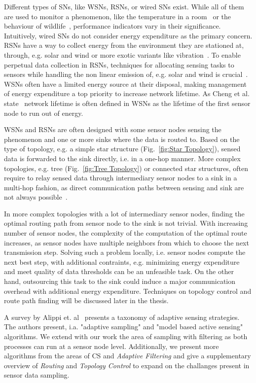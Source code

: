 Different types of \acp{SN}, like \acp{WSN}, \acp{RSN}, or wired \acp{SN}
exist. While all of them are used to monitor a phenomenon, like the temperature
in a room~\cite{labdata} or the behaviour of
wildlife~\cite{bennett2011cranetracker}, performance indicators vary in their
significance. Intuitively, wired \acp{SN} do not consider energy expenditure as
the primary concern. \acp{RSN} have a way to collect energy from the
environment they are stationed at, through, e.g. solar and wind or more exotic
variants like vibration~\cite{perpetuum}. To enable perpetual data collection
in \acp{RSN}, techniques for allocating sensing tasks to sensors while handling
the non linear emission of, e.g. solar and wind is
crucial~\cite{liu2011perpetual}. \acp{WSN} often have a limited energy source
at their disposal, making management of energy expenditure a top priority to
increase network lifetime. As Cheng et al. state~\cite{cheng2013stcdg} network
lifetime is often defined in \acp{WSN} as the lifetime of the first sensor node
to run out of energy. 
\par
\acp{WSN} and \acp{RSN} are often designed with some sensor nodes sensing the
phenomenon and one or more sinks where the data is routed to. Based on the type
of topology, e.g. a simple star structure (Fig.~\ref{fig:Star Topology}),
sensed data is forwarded to the sink directly, i.e. in a one-hop manner.
More complex topologies, e.g. tree (Fig.~\ref{fig:Tree Topology}) or connected
star structures, often require to relay sensed data through intermediary sensor
nodes to a sink in a multi-hop fashion, as direct communication paths
between sensing and sink are not always possible~\cite{romer2004design}. 
\par
In more complex topologies with a lot of intermediary sensor nodes, finding the
optimal routing path from sensor node to the sink is not trivial. With
increasing number of sensor nodes, the complexity of the computation of the
optimal route increases, as sensor nodes have multiple neighbors from which to
choose the next transmission step. Solving such a problem locally, i.e. sensor
nodes compute the next best step, with additional contraints, e.g. minimizing
energy expenditure and meet quality of data thresholds can be an unfeasible
task. On the other hand, outsourcing this task to the sink could induce a major
communication overhead with additional energy expenditure. Techniques on
topology control and route path finding will be discussed later in the thesis.
\par
A survey by Alippi et. al~\cite{alippi2009energy} presents a taxonomy of
adaptive sensing strategies. The authors present, i.a. "adaptive sampling" and
"model based active sensing" algorithms. We extend with our work the area of
sampling with filtering as both processes can run at a sensor node level.
Additionally, we present more algorithms from the areas of \ac{CS} and
\textit{Adaptive Filtering} and give a supplementary overview of
\textit{Routing} and \textit{Topology Control} to expand on the challanges
present in sensor data sampling.

